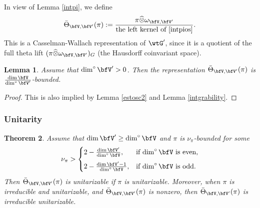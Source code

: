 \documentclass[12pt,a4paper]{amsart}
\newcommand{\mjjc}[1]{\marginpar{\color{green}\tiny #1 \mbox{--ma}}}
\numberwithin{equation}{section}
\newtheorem{thm}{Theorem}[section]
\newtheorem{lem}[thm]{Lemma}
\theoremstyle{remark}
\def\abfV{\bfV'}
\def\dimo{\dim^\circ}
\def\Thetab{\bar{\Theta}}
\def\tGVar{\wtG'}
\begin{document}
In view of Lemma \ref{intpi}, we define
\begin{equation}\label{thetab0}
  \Thetab_{\bfV,\abfV}(\pi):=\frac{\pi\widehat \otimes \omega_{\bfV,\abfV}}{\textrm{the left kernel of \eqref{intpios}}}.
\end{equation}
This is a Casselman-Wallach representation of $\tGVar$, since it is a quotient of the full theta lift  $(\pi\widehat \otimes \omega_{\bfV,\abfV})_G$ (the Hausdorff coinvariant space).



\begin{lem}\label{intpi2}
Assume that $\dimo \abfV>0$. Then the representation
$\Thetab_{\bfV,\abfV}(\pi)$ is $\frac{\dim \bfV}{\dimo \abfV}$-bounded.
\end{lem}
\begin{proof}
This is also implied by Lemma \ref{estosc2} and Lemma \ref{intgrability}.
\end{proof}

\subsubsection{Unitarity}


\begin{thm}\label{positivity0}
Assume that $\dim \abfV\geq \dimo \bfV$ and $\pi$ is  $\nu_\pi$-bounded for some
\[
  \nu_\pi>\begin{cases}
    2-\frac{\dim \abfV}{\dimo \bfV},&\text{if $\dimo \bfV$ is even,}\medskip\\
    2-\frac{\dim \abfV-1}{\dimo \bfV}, &\text{if $\dimo \bfV$ is odd.}
  \end{cases}
\]
Then $\Thetab_{\bfV,\abfV}(\pi)$ is unitarizable if  $\pi$ is unitarizable.
Moreover, when $\pi$ is irreducible and unitarizable, and $\Thetab_{\bfV,\abfV}(\pi)$ is nonzero,
then $\Thetab_{\bfV,\abfV}(\pi)$ is irreducible unitarizable.
\end{thm}
\end{document}
